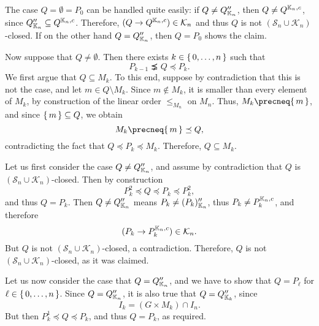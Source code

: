 \begin{Proof}
  The case $Q = \emptyset = P_{0}$ can be handled quite easily: if $Q \neq Q_{{\mathbb{K}}_{n}}''$, then $Q \neq Q^{{\mathbb{K}}_{n}, c}$, since $Q_{{\mathbb{K}}_{n}}'' \subseteq Q^{{\mathbb{K}}_{n}, c}$.  Therefore, $(Q \to Q^{{\mathbb{K}}_{n}, c}) \in \mathcal{K}_{n}$ and thus $Q$
  is not $(\mathcal{S}_{n} \cup \mathcal{K}_{n})$-closed.  If on the other hand $Q =
  Q_{{\mathbb{K}}_{n}}''$, then $Q = P_{0}$ shows the claim.

  Now suppose that $Q \neq \emptyset$.  Then there exists $k \in {\ensuremath{\{\,0, \dots, n\,\}}}$ such that
  \begin{equation*}
    P_{k-1} \precneq Q \preceq P_{k}.
  \end{equation*}
  We first argue that $Q \subseteq M_{k}$.  To this end, suppose by contradiction that
  this is not the case, and let $m \in Q \setminus M_{k}$.  Since $m \notin M_{k}$, it is
  smaller than every element of $M_{k}$, by construction of the linear order
  $\leq_{M_{n}}$ on $M_{n}$.  Thus, $M_{k} \precneq \set{m}$, and since ${\{\,m\,\}} \subseteq
  Q$, we obtain
  \begin{equation*}
    M_{k} \precneq \set{m} \preceq Q,
  \end{equation*}
  contradicting the fact that $Q \preceq P_{k} \preceq M_{k}$.  Therefore, $Q \subseteq
  M_{k}$.

  Let us first consider the case $Q \neq Q_{{\mathbb{K}}_{n}}''$, and assume by contradiction
  that $Q$ is $(\mathcal{S}_{n} \cup \mathcal{K}_{n})$-closed.  Then by construction
  \begin{equation*}
    P_{k}^{2} \preceq Q \preceq P_{k} \preceq P_{k}^{2},
  \end{equation*}
  and thus $Q = P_{k}$.  Then $Q \neq Q_{{\mathbb{K}}_{n}}''$ means $P_{k} \neq (P_{k})_{{\mathbb{K}}_{n}}''$, thus $P_{k} \neq P_{k}^{{\mathbb{K}}_{n}, c}$, and therefore
  \begin{equation*}
    (P_{k} \to P_{k}^{{\mathbb{K}}_{n}, c}) \in \mathcal{K}_{n}.
  \end{equation*}
  But $Q$ is not $(\mathcal{S}_{n} \cup \mathcal{K}_{n})$-closed, a contradiction.
  Therefore, $Q$ is not $(\mathcal{S}_{n} \cup \mathcal{K}_{n})$-closed, as it was
  claimed.

  Let us now consider the case that $Q = Q_{{\mathbb{K}}_{n}}''$, and we have to show that $Q =
  P_{\ell}$ for $\ell \in {\ensuremath{\{\, 0, \dots, n \,\}}}$.  Since $Q = Q_{{\mathbb{K}}_{n}}''$, it is also
  true that $Q = Q_{{\mathbb{K}}_{k}}''$, since
  \begin{equation*}
    I_{k} = (G \times M_{k}) \cap I_{n}.
  \end{equation*}
  But then $P_{k}^{1} \preceq Q \preceq P_{k}$, and thus $Q = P_{k}$, as required.
\end{Proof}

